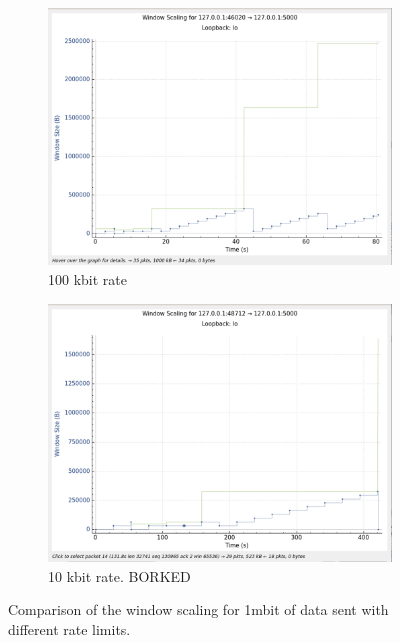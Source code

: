 \documentclass{report}
\begin{document}
\begin{figure}[H]
    \begin{subfigure}[b]{0.45\textwidth}
        \centering
        \includegraphics[width=\textwidth]{Pics/Cubic/r100kbit_s1m_ws}
        \caption{100 kbit rate}
    \end{subfigure}
    \hfill
    \begin{subfigure}[b]{0.45\textwidth}
        \centering
        \includegraphics[width=\textwidth]{Pics/Cubic/r10kbit_s1m_ws}
        \caption{10 kbit rate. BORKED}
    \end{subfigure}
    \caption{Comparison of the window scaling for 1mbit of data sent with different rate limits.}
    \label{fig:four_images}
\end{figure}
\end{document}
